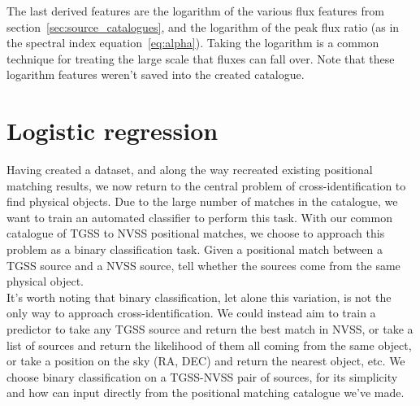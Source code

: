 \documentclass[12pt,a4paper]{article}
\begin{document}
The last derived features are the logarithm of the various flux features from section~\ref{sec:source_catalogues}, and the logarithm of the peak flux ratio (as in the spectral index equation~\ref{eq:alpha}). Taking the logarithm is a common technique for treating the large scale that fluxes can fall over. Note that these logarithm features weren't saved into the created catalogue.

\newpage
\section{Logistic regression}
\label{sec:logistic_regression}
Having created a dataset, and along the way recreated existing positional matching results, we now return to the central problem of cross-identification to find physical objects. Due to the large number of matches in the catalogue, we want to train an automated classifier to perform this task. With our common catalogue of TGSS to NVSS positional matches, we choose to approach this problem as a binary classification task. Given a positional match between a TGSS source and a NVSS source, tell whether the sources come from the same physical object.\\

It's worth noting that binary classification, let alone this variation, is not the only way to approach cross-identification. We could instead aim to train a predictor to take any TGSS source and return the best match in NVSS, or take a list of sources and return the likelihood of them all coming from the same object, or take a position on the sky (RA, DEC) and return the nearest object, etc. We choose binary classification on a TGSS-NVSS pair of sources, for its simplicity and how can input directly from the positional matching catalogue we've made.
\end{document}
